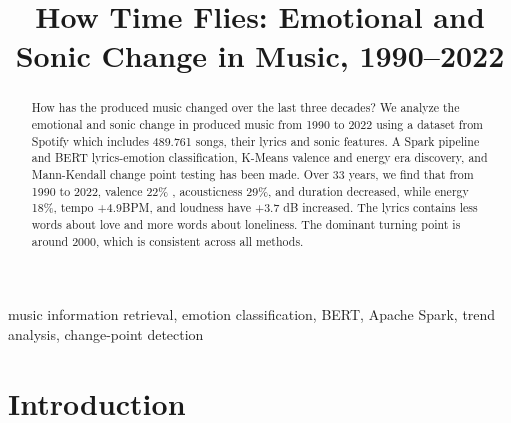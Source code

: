 \documentclass[conference]{IEEEtran}
\begin{document}
\title{How Time Flies: Emotional and Sonic Change in Music, 1990--2022}

\author{
}

\maketitle

\begin{abstract}
    How has the produced music changed over the last three decades? We analyze the emotional and sonic change in produced music from 1990 to 2022 using a dataset from Spotify which includes 489.761 songs, their lyrics and sonic features. A Spark pipeline and BERT lyrics-emotion classification, K-Means valence and energy era discovery, and Mann-Kendall change point testing has been made. Over 33 years, we find that from 1990 to 2022, valence 22\% , acousticness 29\%, and duration decreased, while energy 18\%, tempo +4.9BPM, and loudness have +3.7 dB increased. The lyrics contains less words about love and more words about loneliness. The dominant turning point is around 2000, which is consistent across all methods.
\end{abstract}

\begin{IEEEkeywords}
music information retrieval, emotion classification, BERT, Apache Spark, trend analysis, change-point detection
\end{IEEEkeywords}

\section{Introduction}
\end{document}
